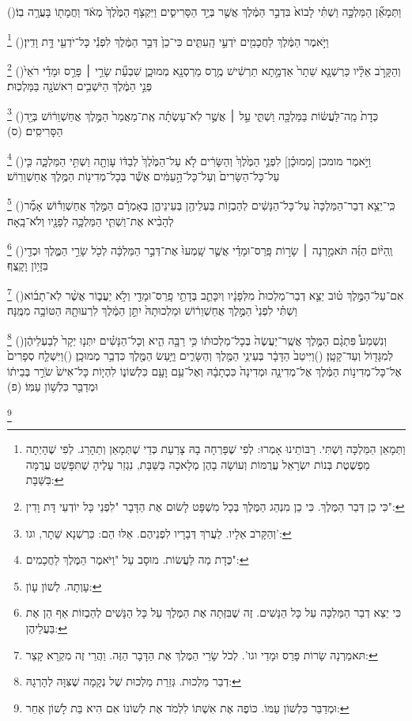 \documentclass[12pt, openany]{book}
\newcommand{\footnotecomment}[1]{
	\renewcommand\thefootnote{}
	\footnote{#1}}
\newcommand{\commenta}[1]{\footnotecomment{#1}\hspace{0em}}
\newcommand{\vsnum}[1]{(\hebrewnumeral{#1})\space}
\begin{document}
{\vsnum{12}וַתְּמָאֵ֞ן הַמַּלְכָּ֣ה וַשְׁתִּ֗י לָבוֹא֙ בִּדְבַ֣ר הַמֶּ֔לֶךְ אֲשֶׁ֖ר בְּיַ֣ד הַסָּרִיסִ֑ים וַיִּקְצֹ֤ף הַמֶּ֙לֶךְ֙ מְאֹ֔ד וַחֲמָת֖וֹ בָּעֲרָ֥ה בֽוֹ׃%
\commenta{וַתְּמָאֵן הַמַּלְכָּה וַשְׁתִּי. רַבּוֹתֵינוּ אָמְרוּ: לְפִי שֶׁפָּרְחָה בָהּ צָרַעַת כְּדֵי שֶׁתְּמָאֵן וְתֵהָרֵג. לְפִי שֶׁהָיְתָה מַפְשֶׁטֶת בְּנוֹת יִשְׂרָאֵל עֲרֻמּוֹת וְעוֹשָׂה בָהֶן מְלָאכָה בַּשַּׁבָּת, נִגְזַר עָלֶיהָ שֶׁתִּפָּשֵׁט עֲרֻמָּה בַּשַּׁבָּת: }%
\vsnum{13}וַיֹּ֣אמֶר הַמֶּ֔לֶךְ לַחֲכָמִ֖ים יֹדְעֵ֣י הָֽעִתִּ֑ים כִּי־כֵן֙ דְּבַ֣ר הַמֶּ֔לֶךְ לִפְנֵ֕י כָּל־יֹדְעֵ֖י דָּ֥ת וָדִֽין׃%
\commenta{כִּי כֵן דְּבַר הַמֶּלֶךְ. כִּי כֵן מִנְהַג הַמֶּלֶךְ בְּכָל מִשְׁפָּט לָשׂוּם אֶת הַדָּבָר "לִפְנֵי כָּל יוֹדְעֵי דָּת וָדִין": }%
\vsnum{14}וְהַקָּרֹ֣ב אֵלָ֗יו כַּרְשְׁנָ֤א שֵׁתָר֙ אַדְמָ֣תָא תַרְשִׁ֔ישׁ מֶ֥רֶס מַרְסְנָ֖א מְמוּכָ֑ן שִׁבְעַ֞ת שָׂרֵ֣י ׀ פָּרַ֣ס וּמָדַ֗י רֹאֵי֙ פְּנֵ֣י הַמֶּ֔לֶךְ הַיֹּשְׁבִ֥ים רִאשֹׁנָ֖ה בַּמַּלְכֽוּת׃%
\commenta{וְהַקָּרֹב אֵלָיו. לַעֲרֹךְ דְּבָרָיו לִפְנֵיהֶם. אֵלּוּ הֵם: כַּרְשְׁנָא שֵׁתָר, וגו': }%
\vsnum{15}כְּדָת֙ מַֽה־לַּעֲשׂ֔וֹת בַּמַּלְכָּ֖ה וַשְׁתִּ֑י עַ֣ל ׀ אֲשֶׁ֣ר לֹֽא־עָשְׂתָ֗ה אֶֽת־מַאֲמַר֙ הַמֶּ֣לֶךְ אֲחַשְׁוֵר֔וֹשׁ בְּיַ֖ד הַסָּרִיסִֽים׃ (ס)%
\commenta{כְּדָת מַה לַּעֲשׂוֹת. מוּסָב עַל "וַיֹּאמֶר הַמֶּלֶךְ לַחֲכָמִים": }%
\vsnum{16}וַיֹּ֣אמֶר מומכן [מְמוּכָ֗ן] לִפְנֵ֤י הַמֶּ֙לֶךְ֙ וְהַשָּׂרִ֔ים לֹ֤א עַל־הַמֶּ֙לֶךְ֙ לְבַדּ֔וֹ עָוְתָ֖ה וַשְׁתִּ֣י הַמַּלְכָּ֑ה כִּ֤י עַל־כָּל־הַשָּׂרִים֙ וְעַל־כָּל־הָ֣עַמִּ֔ים אֲשֶׁ֕ר בְּכָל־מְדִינ֖וֹת הַמֶּ֥לֶךְ אֲחַשְׁוֵרֽוֹשׁ׃%
\commenta{עָוְתָה. לְשׁוֹן עָו‍ֹן:}%
\vsnum{17}כִּֽי־יֵצֵ֤א דְבַר־הַמַּלְכָּה֙ עַל־כָּל־הַנָּשִׁ֔ים לְהַבְז֥וֹת בַּעְלֵיהֶ֖ן בְּעֵינֵיהֶ֑ן בְּאָמְרָ֗ם הַמֶּ֣לֶךְ אֲחַשְׁוֵר֡וֹשׁ אָמַ֞ר לְהָבִ֨יא אֶת־וַשְׁתִּ֧י הַמַּלְכָּ֛ה לְפָנָ֖יו וְלֹא־בָֽאָה׃%
\commenta{כִּי יֵצֵא דְבַר הַמַּלְכָּה עַל כָּל הַנָּשִׁים. זֶה שֶׁבִּזְּתָה אֶת הַמֶּלֶךְ עַל כָּל הַנָּשִׁים לְהַבְזוֹת אַף הֵן אֶת בַּעֲלֵיהֶן:}%
\vsnum{18}וְֽהַיּ֨וֹם הַזֶּ֜ה תֹּאמַ֣רְנָה ׀ שָׂר֣וֹת פָּֽרַס־וּמָדַ֗י אֲשֶׁ֤ר שָֽׁמְעוּ֙ אֶת־דְּבַ֣ר הַמַּלְכָּ֔ה לְכֹ֖ל שָׂרֵ֣י הַמֶּ֑לֶךְ וּכְדַ֖י בִּזָּי֥וֹן וָקָֽצֶף׃%
\commenta{תּאמַרְנָה שָׂרוֹת פָּרַס וּמָדַי וגו'. לְכֹל שָׂרֵי הַמֶּלֶךְ אֶת הַדָּבָר הַזֶּה. וַהֲרֵי זֶה מִקְרָא קָצֵר:}%
\vsnum{19}אִם־עַל־הַמֶּ֣לֶךְ ט֗וֹב יֵצֵ֤א דְבַר־מַלְכוּת֙ מִלְּפָנָ֔יו וְיִכָּתֵ֛ב בְּדָתֵ֥י פָֽרַס־וּמָדַ֖י וְלֹ֣א יַעֲב֑וֹר אֲשֶׁ֨ר לֹֽא־תָב֜וֹא וַשְׁתִּ֗י לִפְנֵי֙ הַמֶּ֣לֶךְ אֲחַשְׁוֵר֔וֹשׁ וּמַלְכוּתָהּ֙ יִתֵּ֣ן הַמֶּ֔לֶךְ לִרְעוּתָ֖הּ הַטּוֹבָ֥ה מִמֶּֽנָּה׃%
\commenta{דְבַר מַלְכוּת. גְּזֵרַת מַלְכוּת שֶׁל נְקָמָה שֶׁצִּוָּה לְהָרְגָהּ:}%
\vsnum{20}וְנִשְׁמַע֩ פִּתְגָ֨ם הַמֶּ֤לֶךְ אֲשֶֽׁר־יַעֲשֶׂה֙ בְּכָל־מַלְכוּת֔וֹ כִּ֥י רַבָּ֖ה הִ֑יא וְכָל־הַנָּשִׁ֗ים יִתְּנ֤וּ יְקָר֙ לְבַעְלֵיהֶ֔ן לְמִגָּד֖וֹל וְעַד־קָטָֽן׃
\vsnum{21}וַיִּיטַב֙ הַדָּבָ֔ר בְּעֵינֵ֥י הַמֶּ֖לֶךְ וְהַשָּׂרִ֑ים וַיַּ֥עַשׂ הַמֶּ֖לֶךְ כִּדְבַ֥ר מְמוּכָֽן׃
\vsnum{22}וַיִּשְׁלַ֤ח סְפָרִים֙ אֶל־כָּל־מְדִינ֣וֹת הַמֶּ֔לֶךְ אֶל־מְדִינָ֤ה וּמְדִינָה֙ כִּכְתָבָ֔הּ וְאֶל־עַ֥ם וָעָ֖ם כִּלְשׁוֹנ֑וֹ לִהְי֤וֹת כָּל־אִישׁ֙ שֹׂרֵ֣ר בְּבֵית֔וֹ וּמְדַבֵּ֖ר כִּלְשׁ֥וֹן עַמּֽוֹ׃ (פ)%
\commenta{וּמְדַבֵּר כִּלְשׁוֹן עַמּוֹ. כּוֹפֶה אֶת אִשְׁתּוֹ לִלְמֹד אֶת לְשׁוֹנוֹ אִם הִיא בַּת לָשׁוֹן אַחֵר:}%
\clearpage}
\end{document}
